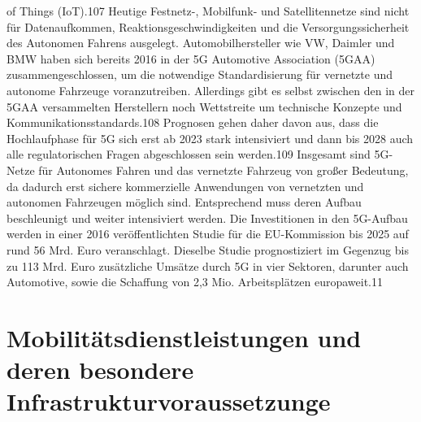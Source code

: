 of Things (IoT).107 Heutige Festnetz-, Mobilfunk- und Satellitennetze sind nicht
für Datenaufkommen, Reaktionsgeschwindigkeiten und die Versorgungssicherheit des Autonomen Fahrens ausgelegt. Automobilhersteller wie VW, Daimler und
BMW haben sich bereits 2016 in der 5G Automotive Association (5GAA) zusammengeschlossen, um die notwendige Standardisierung für vernetzte und autonome
Fahrzeuge voranzutreiben. Allerdings gibt es selbst zwischen den in der 5GAA versammelten Herstellern noch Wettstreite um technische Konzepte und Kommunikationsstandards.108 Prognosen gehen daher davon aus, dass die Hochlaufphase für
5G sich erst ab 2023 stark intensiviert und dann bis 2028 auch alle regulatorischen
Fragen abgeschlossen sein werden.109
Insgesamt sind 5G-Netze für Autonomes Fahren und das vernetzte Fahrzeug
von großer Bedeutung, da dadurch erst sichere kommerzielle Anwendungen von
vernetzten und autonomen Fahrzeugen möglich sind. Entsprechend muss deren
Aufbau beschleunigt und weiter intensiviert werden. Die Investitionen in den
5G-Aufbau werden in einer 2016 veröffentlichten Studie für die EU-Kommission
bis 2025 auf rund 56 Mrd. Euro veranschlagt. Dieselbe Studie prognostiziert
im Gegenzug bis zu 113 Mrd. Euro zusätzliche Umsätze durch 5G in vier Sektoren, darunter auch Automotive, sowie die Schaffung von 2,3 Mio. Arbeitsplätzen
europaweit.11



\chapter{Mobilitätsdienstleistungen und deren besondere Infrastrukturvoraussetzunge}
